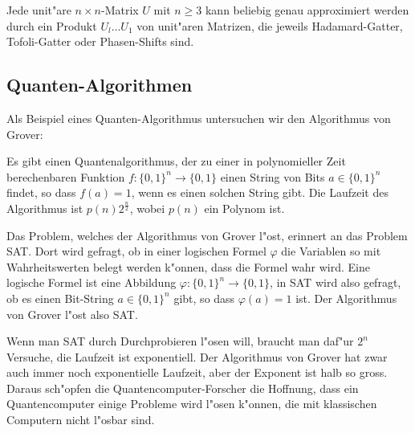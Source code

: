 \begin{satz}
Jede unit"are $n\times n$-Matrix $U$ mit $n\ge 3$ kann beliebig genau
approximiert werden durch ein Produkt $U_l\dots U_1$ von unit"aren
Matrizen, die jeweils Hadamard-Gatter, Tofoli-Gatter oder Phasen-Shifts
sind.
\cite[Theorem 10.12]{skript:arorabarak}
\end{satz}

\subsection{Quanten-Algorithmen}
Als Beispiel eines Quanten-Algorithmus untersuchen wir den Algorithmus
von Grover:
\begin{satz}[Grover]
Es gibt einen Quantenalgorithmus, der zu einer in polynomieller Zeit
berechenbaren Funktion $f\colon\{0,1\}^n\to\{0,1\}$ einen String von Bits
$a\in\{0,1\}^n$ findet, so dass $f(a)=1$, wenn es einen solchen String gibt.
Die Laufzeit des Algorithmus ist $p(n) 2^{\frac{n}2}$, wobei $p(n)$ ein
Polynom ist.
\label{skript:satz-von-grover}
\end{satz}

Das Problem, welches der Algorithmus von Grover l"ost, erinnert an das
Problem SAT.
Dort wird gefragt, ob in einer logischen Formel $\varphi$ die Variablen
so mit Wahrheitswerten belegt werden k"onnen, dass die Formel wahr wird.
Eine logische Formel ist eine Abbildung $\varphi\colon\{0,1\}^n\to\{0,1\}$,
in SAT wird also gefragt, ob es einen Bit-String $a\in\{0,1\}^n$ gibt, 
so dass $\varphi(a)=1$ ist.
Der Algorithmus von Grover l"ost also SAT.

Wenn man SAT durch Durchprobieren l"osen will, braucht man daf"ur $2^n$
Versuche, die Laufzeit ist exponentiell.
Der Algorithmus von Grover hat zwar auch immer noch exponentielle Laufzeit,
aber der Exponent ist halb so gross.
Daraus sch"opfen die Quantencomputer-Forscher die Hoffnung, dass 
ein Quantencomputer einige Probleme wird l"osen k"onnen, die mit
klassischen Computern nicht l"osbar sind.

